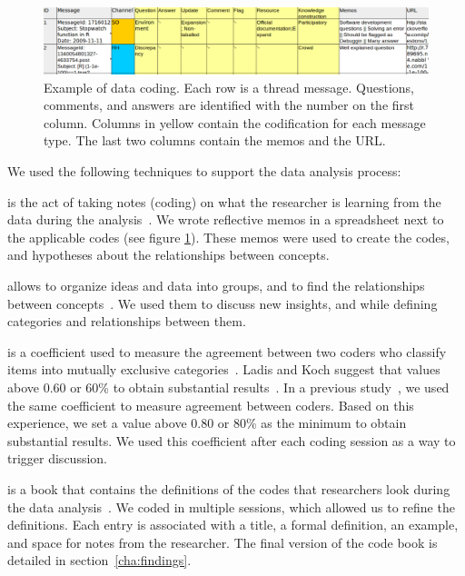     \begin{figure}[htbp]
    	\centering
    	\includegraphics[width=.95\textwidth]{Figures/CodingExample}
    	\caption{Example of data coding. Each row is a thread message. Questions, comments, and answers are identified with the number on the first column. Columns in yellow contain the codification for each message type. The last two columns contain the memos and the URL.}
    	\label{fig:CodingExample}
    \end{figure}

    We used the following techniques to support the data analysis process:

	\begin{description}[itemsep=2pt, topsep=0pt, leftmargin=1em, parsep=0pt]
		\item[Memoing] is the act of taking notes (coding) on what the researcher is learning from the data during the analysis~\cite{Groenewald2008}.
        We wrote reflective memos in a spreadsheet next to the applicable codes (see figure \ref{fig:CodingExample}).
        These memos were used to create the codes, and hypotheses about the relationships between concepts.

		\item[Affinity diagrams] allows to organize ideas and data into groups, and to find the relationships between concepts~\cite{Scupin1997}.
		We used them to discuss new insights, and while defining categories and relationships between them.

		\item[Inter-rater agreement \textit{Cohen Kappa}] is a coefficient used to measure the agreement between two coders who classify items into mutually exclusive categories~\cite{Stemler2004}.
		Ladis and Koch suggest that values above 0.60 or 60\% to obtain substantial results~\cite{Landis1977}.
		In a previous study~\cite{Gomez2013}, we used the same coefficient to measure agreement between coders.
		Based on this experience, we set a value above 0.80 or 80\% as the minimum to obtain substantial results.
		We used this coefficient after each coding session as a way to trigger discussion.

		\item[Code book] is a book that contains the definitions of the codes that researchers look during the data analysis~\cite{MacQueen1998}.
		We coded in multiple sessions, which allowed us to refine the definitions.
		Each entry is associated with a title, a formal definition, an example, and space for notes from the researcher.
		The final version of the code book is detailed in section~\ref{cha:findings}.
	\end{description}

